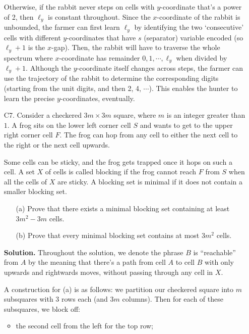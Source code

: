 \documentclass[11pt,a4paper]{article}
\begin{document}
\begin{enumerate}
        Otherwise, if the rabbit never steps on cells with $y$-coordinate that's a power of 2, 
        then $\ell_y$ is constant throughout. 
        Since the $x$-coordinate of the rabbit is unbounded, 
        the farmer can first learn $\ell_y$ by identifying the two `consecutive' cells 
        with different $y$-coordinates that have $s$ (separator) variable encoded (so $\ell_y+1$ is the $x$-gap). 
        Then, the rabbit will have to traverse the whole spectrum where $x$-coordinate has remainder $0, 1, \cdots, \ell_y$ when 
        divided by $\ell_y+1$. 
        Although the $y$-coordinate itself changes across steps, the farmer can use the trajectory of the rabbit to determine the corresponding digits 
        (starting from the unit digits, and then 2, 4, $\cdots$).
        This enables the hunter to learn the precise $y$-coordinates, eventually. 
	    
	    \item [C7.]
	    Consider a checkered $3m\times 3m$ square, where $m$ is an integer greater than $1.$ A frog sits on the lower left corner cell $S$ and wants to get to the upper right corner cell $F.$ The frog can hop from any cell to either the next cell to the right or the next cell upwards.
	    
	    Some cells can be sticky, and the frog gets trapped once it hops on such a cell. A set $X$ of cells is called blocking if the frog cannot reach $F$ from $S$ when all the cells of $X$ are sticky. A blocking set is minimal if it does not contain a smaller blocking set.
	    
	    \begin{enumerate}
	    	\item [(a)] 
	    	Prove that there exists a minimal blocking set containing at least $3m^2-3m$ cells.
	    	
	    	\item [(b)]
	    	Prove that every minimal blocking set contains at most $3m^2$ cells.
	    \end{enumerate}
        
        \textbf{Solution.} 
        Throughout the solution, we denote the phrase $B$ is ``reachable'' from $A$ by the meaning that there's a path from cell $A$ to cell $B$ with only upwards and rightwards moves, 
        without passing through any cell in $X$. 
        
        A construction for (a) is as follows: we partition our checkered square into $m$ subsquares with 3 rows each (and $3m$ columns). 
        Then for each of these subsquares, we block off: 
        \begin{itemize}
        	\item the second cell from the left for the top row; 
        	

\end{itemize}
\end{enumerate}
\end{document}

